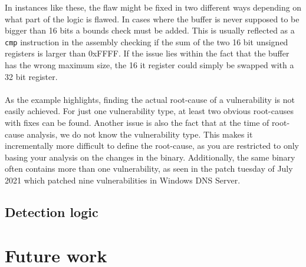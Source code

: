 \documentclass{report}
\begin{document}
In instances like these, the flaw might be fixed in two different ways depending on what part of the logic is flawed. In cases where the buffer is never supposed to be bigger than 16 bits a bounds check must be added. This is usually reflected as a \texttt{cmp} instruction in the assembly checking if the sum of the two 16 bit unsigned registers is larger than 0xFFFF. If the issue lies within the fact that the buffer has the wrong maximum size, the 16 it register could simply be swapped with a 32 bit register.
\\
\\
As the example highlights, finding the actual root-cause of a vulnerability is not easily achieved. For just one vulnerability type, at least two obvious root-causes with fixes can be found. Another issue is also the fact that at the time of root-cause analysis, we do not know the vulnerability type. This makes it incrementally more difficult to define the root-cause, as you are restricted to only basing your analysis on the changes in the binary. Additionally, the same binary often contains more than one vulnerability, as seen in the patch tuesday of July 2021\cite{url:patch-tuesday:2021:july} which patched nine vulnerabilities in Windows DNS Server.



\subsection{Detection logic}

\section{Future work}
\end{document}
